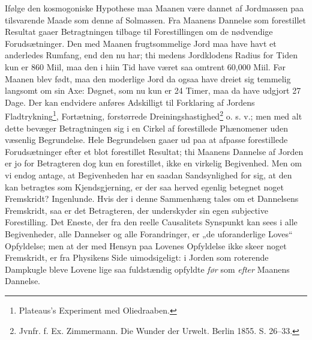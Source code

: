 \documentclass[12pt,a4paper]{book}
\renewcommand{\thefootnote}{*)}
\begin{document}
Ifølge den kosmogoniske Hypothese maa Maanen være dannet af Jordmassen paa
tilsvarende Maade som denne af Solmassen. Fra Maanens Dannelse som forestillet
Resultat gaaer Betragtningen tilbage til Forestillingen om de nødvendige
Forudsætninger. Den med Maanen frugtsommelige Jord maa have havt et anderledes
Rumfang, end den nu har; thi medens Jordklodens Radius for Tiden kun er 860
Miil, maa den i hiin Tid have været saa omtrent 60,000 Miil. Før Maanen blev
født, maa den moderlige Jord da ogsaa have dreiet sig temmelig langsomt om sin
Axe: Døgnet, som nu kun er 24 Timer, maa da have udgjort 27 Dage. Der kan
endvidere anføres Adskilligt til Forklaring af Jordens
Fladtrykning\footnote{%
Plateaus's Experiment med Oliedraaben.},
Fortætning, forstørrede
\renewcommand{\thefootnote}{**)}%
Dreiningshastighed\footnote{%
Jvnfr. f. Ex. Zimmermann. Die Wunder der Urwelt. Berlin 1855. S. 26--33.}%
\renewcommand{\thefootnote}{*)}
{} o. s. v.; men med alt dette bevæger Betragtningen sig i en Cirkel af
forestillede Phænomener uden væsenlig Begrundelse. Hele Begrundelsen gaaer ud
paa at afpasse forestillede Forudsætninger efter et blot forestillet Resultat;
thi Maanens Dannelse af Jorden er jo for Betragteren dog kun en forestillet,
ikke en virkelig Begivenhed. Men om vi endog antage, at Begivenheden har en
saadan Sandsynlighed for sig, at den kan betragtes som Kjendsgjerning, er der
saa herved egenlig betegnet noget Fremskridt? Ingenlunde. Hvis der
i denne Sammenhæng tales om et Dannelsens Fremskridt, saa er det Betragteren,
der underskyder sin egen subjective Forestilling. Det Eneste, der fra den
reelle Causalitets Synspunkt kan sees i alle Begivenheder, alle Dannelser og
alle Forandringer, er „de uforanderlige Loves“ Opfyldelse; men at der med
Hensyn paa Lovenes Opfyldelse ikke skeer noget Fremskridt, er fra Physikens
Side uimodsigeligt: i Jorden som roterende Dampkugle bleve Lovene lige saa
fuldstændig opfyldte \emph{før} som \emph{efter} Maanens Dannelse.
\end{document}
